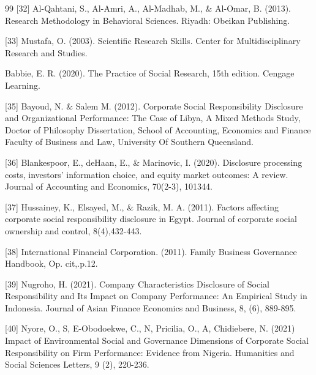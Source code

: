 \documentclass[10pt]{NSP1}
\begin{document}
\begin{thebibliography}{99}
[32] Al-Qahtani, S., Al-Amri, A., Al-Madhab, M., \& Al-Omar, B. (2013). Research Methodology in Behavioral Sciences. Riyadh: Obeikan Publishing.

[33] Mustafa, O. (2003). Scientific Research Skills. Center for Multidisciplinary Research and Studies.

Babbie, E. R. (2020). The Practice of Social Research, 15th edition. Cengage Learning.

[35] Bayoud, N. \& Salem M. (2012). Corporate Social Responsibility Disclosure and Organizational Performance: The Case of Libya, A Mixed Methods Study, Doctor of Philosophy Dissertation, School of Accounting, Economics and Finance Faculty of Business and Law, University Of Southern Queensland.

[36] Blankespoor, E., deHaan, E., \& Marinovic, I. (2020). Disclosure processing costs, investors’ information choice, and equity market outcomes: A review. Journal of Accounting and Economics, 70(2-3), 101344.

[37] Hussainey, K., Elsayed, M., \& Razik, M. A. (2011). Factors affecting corporate social responsibility disclosure in Egypt. Journal of corporate social ownership and control, 8(4),432-443.

[38] International Financial Corporation. (2011). Family Business Governance Handbook, Op. cit,.p.12.

[39] Nugroho, H. (2021). Company Characteristics Disclosure of Social Responsibility and Its Impact on Company Performance: An Empirical Study in Indonesia. Journal of Asian Finance Economics and Business, 8, (6), 889-895.

[40] Nyore, O., S, E-Obodoekwe, C., N, Pricilia, O., A, Chidiebere, N. (2021)  Impact of Environmental Social and Governance Dimensions of Corporate Social Responsibility on Firm Performance: Evidence from Nigeria. Humanities and Social Sciences Letters, 9 (2), 220-236.

\end{thebibliography}
\end{document}
